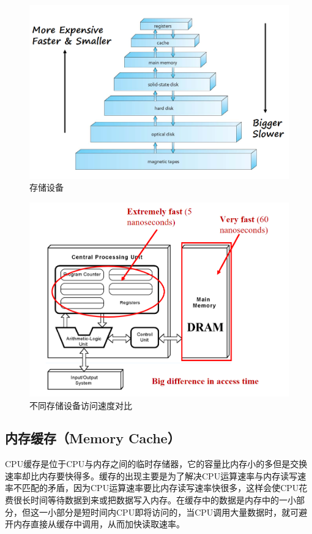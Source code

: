 \begin{figure}[H]
	\centering
	\includegraphics[scale=0.7]{img/C1/1-5/1.png}
	\caption{存储设备}
\end{figure}

\begin{figure}[H]
	\centering
	\includegraphics[scale=0.7]{img/C1/1-5/2.png}
	\caption{不同存储设备访问速度对比}
\end{figure}

\subsection{内存缓存（Memory Cache）}

CPU缓存是位于CPU与内存之间的临时存储器，它的容量比内存小的多但是交换速率却比内存要快得多。缓存的出现主要是为了解决CPU运算速率与内存读写速率不匹配的矛盾，因为CPU运算速率要比内存读写速率快很多，这样会使CPU花费很长时间等待数据到来或把数据写入内存。在缓存中的数据是内存中的一小部分，但这一小部分是短时间内CPU即将访问的，当CPU调用大量数据时，就可避开内存直接从缓存中调用，从而加快读取速率。

